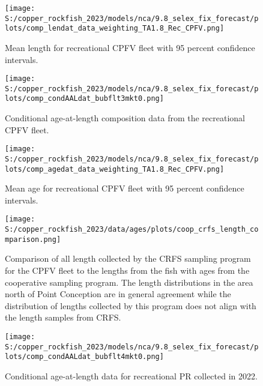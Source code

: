 \documentclass[
  letterpaper,
]{article}
\begin{document}
\pagebreak

\begin{figure}
\centering
\texttt{[image: S:/copper\_rockfish\_2023/models/nca/9.8\_selex\_fix\_forecast/plots/comp\_lendat\_data\_weighting\_TA1.8\_Rec\_CPFV.png]}
\caption{Mean length for recreational CPFV fleet with 95 percent confidence intervals.\label{fig:mean-rec-cpfv-len-data}}
\end{figure}

\pagebreak

\begin{figure}
\centering
\texttt{[image: S:/copper\_rockfish\_2023/models/nca/9.8\_selex\_fix\_forecast/plots/comp\_condAALdat\_bubflt3mkt0.png]}
\caption{Conditional age-at-length composition data from the recreational CPFV fleet.\label{fig:rec-cpfv-caal-data}}
\end{figure}

\pagebreak

\begin{figure}
\centering
\texttt{[image: S:/copper\_rockfish\_2023/models/nca/9.8\_selex\_fix\_forecast/plots/comp\_agedat\_data\_weighting\_TA1.8\_Rec\_CPFV.png]}
\caption{Mean age for recreational CPFV fleet with 95 percent confidence intervals.\label{fig:mean-rec-cpfv-age-data}}
\end{figure}

\pagebreak

\begin{figure}
\centering
\texttt{[image: S:/copper\_rockfish\_2023/data/ages/plots/coop\_crfs\_length\_comparison.png]}
\caption{Comparison of all length collected by the CRFS sampling program for the CPFV fleet to the lengths from the fish with ages from the cooperative sampling program. The length distributions in the area north of Point Conception are in general agreement while the distribution of lengths collected by this program does not align with the length samples from CRFS.\label{fig:coop-len-comparison}}
\end{figure}

\pagebreak

\begin{figure}
\centering
\texttt{[image: S:/copper\_rockfish\_2023/models/nca/9.8\_selex\_fix\_forecast/plots/comp\_condAALdat\_bubflt4mkt0.png]}
\caption{Conditional age-at-length data for recreational PR collected in 2022.\label{fig:rec-pr-caal-data}}
\end{figure}
\end{document}
